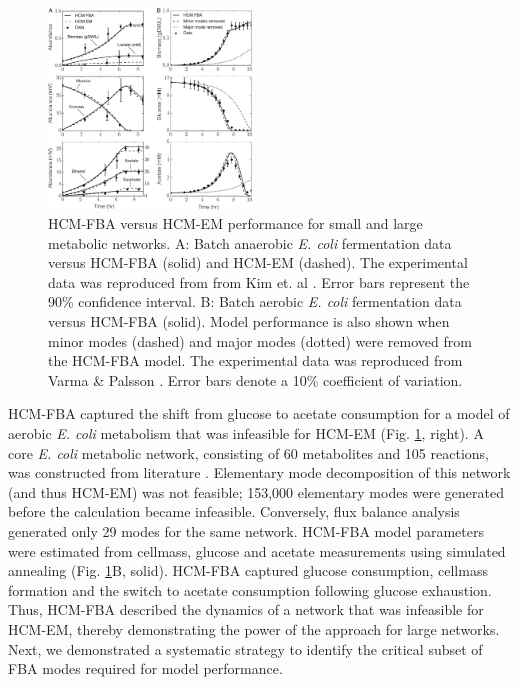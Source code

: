 \documentclass[10pt,twocolumn,twoside,final]{IEEEtran}
\begin{document}
\begin{figure}[!t]\centering
\includegraphics[width=0.48\textwidth]{./figs/Fig-2-Ecoli-SimulationResults.pdf}
\caption{HCM-FBA versus HCM-EM performance for small and large metabolic networks.
A: Batch anaerobic \textit{E. coli} fermentation data versus HCM-FBA (solid) and HCM-EM (dashed).
The experimental data was reproduced from from Kim et. al \cite{2008_kim_varner_ramkrishna_BiotechProg}. Error bars represent the 90\% confidence interval.
B: Batch aerobic \textit{E. coli} fermentation data versus HCM-FBA (solid).
Model performance is also shown when minor modes (dashed) and major modes (dotted) were removed from the HCM-FBA model.
The experimental data was reproduced from Varma \& Palsson \cite{1994_varma_palsson_ApplEnvMicro}. Error bars denote a 10\% coefficient of variation.}
\label{fig:ecoli}
\end{figure}

HCM-FBA captured the shift from glucose to acetate consumption for a model of aerobic \textit{E. coli} metabolism that was infeasible for HCM-EM (Fig. \ref{fig:ecoli}, right).
A core \emph{E. coli} metabolic network, consisting of 60 metabolites and 105 reactions, was constructed from literature \cite{2007_schuetz_etal_MolSysBio,2006_Palsson_model}.
Elementary mode decomposition of this network (and thus HCM-EM) was not feasible; 153,000 elementary modes were generated before the calculation became infeasible.
Conversely, flux balance analysis generated only 29 modes for the same network.
HCM-FBA model parameters were estimated from cellmass, glucose and acetate measurements \cite{1994_varma_palsson_ApplEnvMicro} using simulated annealing (Fig. \ref{fig:ecoli}B, solid).
HCM-FBA captured glucose consumption, cellmass formation and the switch to acetate consumption following glucose exhaustion.
Thus, HCM-FBA described the dynamics of a network that was infeasible for HCM-EM, thereby demonstrating the power of the approach for large networks.
Next, we demonstrated a systematic strategy to identify the critical subset of FBA modes required for model performance.
\end{document}
